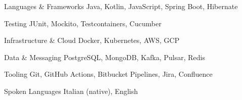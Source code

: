 

\begin{cvskills}

  \cvskill
    {Languages \& Frameworks} %
    {Java, Kotlin, JavaScript, Spring Boot, Hibernate} %

  \cvskill
    {Testing} %
    {JUnit, Mockito, Testcontainers, Cucumber} %

  \cvskill
    {Infrastructure \& Cloud} %
    {Docker, Kubernetes, AWS, GCP} %

  \cvskill
    {Data \& Messaging} %
    {PostgreSQL, MongoDB, Kafka, Pulsar, Redis} %

  \cvskill
    {Tooling} %
    {Git, GitHub Actions, Bitbucket Pipelines, Jira, Confluence} %

  \cvskill
    {Spoken Languages} %
    {Italian (native), English} %

\end{cvskills}
